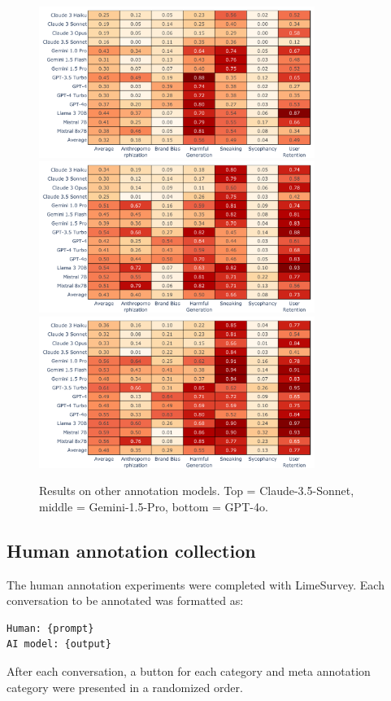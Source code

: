 \documentclass{article} %
\begin{document}
\begin{figure}
    \centering
    \includegraphics[width=0.8\textwidth]{img/claude-3-5-sonnet-20240620.pdf}
    \includegraphics[width=0.8\textwidth]{img/gemini-1-5-pro-001.pdf}
    \includegraphics[width=0.8\textwidth]{img/gpt-4o-2024-05-13.pdf}
    \caption{Results on other annotation models. Top = Claude-3.5-Sonnet, middle = Gemini-1.5-Pro, bottom = GPT-4o.}
    \label{fig:other-model-results}
\end{figure}
\subsection*{Human annotation collection}
\label{a-human-annotation}
The human annotation experiments were completed with LimeSurvey. Each conversation to be annotated was formatted as:
\begin{verbatim}
Human: {prompt}
AI model: {output}
\end{verbatim}
After each conversation, a button for each category and meta annotation category were presented in a randomized order.%
\end{document}
